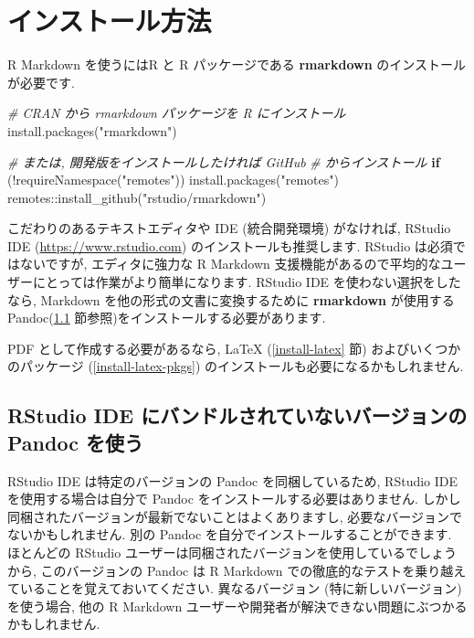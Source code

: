 \documentclass[
  11pt,
  lualatex,ja=standard,jafont=noto]{bxjsreport}
\newenvironment{Shaded}{\begin{snugshade}}{\end{snugshade}}
\newcommand{\CommentTok}[1]{\textcolor[rgb]{0.56,0.35,0.01}{\textit{#1}}}
\newcommand{\ControlFlowTok}[1]{\textcolor[rgb]{0.13,0.29,0.53}{\textbf{#1}}}
\newcommand{\FunctionTok}[1]{\textcolor[rgb]{0.00,0.00,0.00}{#1}}
\newcommand{\NormalTok}[1]{#1}
\newcommand{\SpecialCharTok}[1]{\textcolor[rgb]{0.00,0.00,0.00}{#1}}
\newcommand{\StringTok}[1]{\textcolor[rgb]{0.31,0.60,0.02}{#1}}
\begin{document}
\mainmatter

\hypertarget{installation}{%
\chapter{インストール方法}\label{installation}}

R Markdown を使うにはR \autocite{R-base} と R パッケージである \textbf{rmarkdown} \autocite{R-rmarkdown} のインストールが必要です.

\begin{Shaded}
\begin{Highlighting}[numbers=left,,]
\CommentTok{\# CRAN から rmarkdown パッケージを R にインストール}
\FunctionTok{install.packages}\NormalTok{(}\StringTok{"rmarkdown"}\NormalTok{)}

\CommentTok{\# または, 開発版をインストールしたければ GitHub}
\CommentTok{\# からインストール}
\ControlFlowTok{if}\NormalTok{ (}\SpecialCharTok{!}\FunctionTok{requireNamespace}\NormalTok{(}\StringTok{"remotes"}\NormalTok{)) }\FunctionTok{install.packages}\NormalTok{(}\StringTok{"remotes"}\NormalTok{)}
\NormalTok{remotes}\SpecialCharTok{::}\FunctionTok{install\_github}\NormalTok{(}\StringTok{"rstudio/rmarkdown"}\NormalTok{)}
\end{Highlighting}
\end{Shaded}

こだわりのあるテキストエディタや IDE (統合開発環境) がなければ, RStudio IDE (\url{https://www.rstudio.com}) のインストールも推奨します. RStudio は必須ではないですが, エディタに強力な R Markdown 支援機能があるので平均的なユーザーにとっては作業がより簡単になります. RStudio IDE を使わない選択をしたなら, Markdown を他の形式の文書に変換するために \textbf{rmarkdown} が使用する Pandoc(\ref{install-pandoc} 節参照)をインストールする必要があります.

PDF として作成する必要があるなら, LaTeX (\ref{install-latex} 節) およびいくつかのパッケージ (\ref{install-latex-pkgs}) のインストールも必要になるかもしれません.

\hypertarget{install-pandoc}{%
\section{RStudio IDE にバンドルされていないバージョンの Pandoc を使う}\label{install-pandoc}}

RStudio IDE は特定のバージョンの Pandoc を同梱しているため, RStudio IDE を使用する場合は自分で Pandoc をインストールする必要はありません. しかし同梱されたバージョンが最新でないことはよくありますし, 必要なバージョンでないかもしれません. 別の Pandoc を自分でインストールすることができます. ほとんどの RStudio ユーザーは同梱されたバージョンを使用しているでしょうから, このバージョンの Pandoc は R Markdown での徹底的なテストを乗り越えていることを覚えておいてください. 異なるバージョン (特に新しいバージョン) を使う場合, 他の R Markdown ユーザーや開発者が解決できない問題にぶつかるかもしれません.
\end{document}
